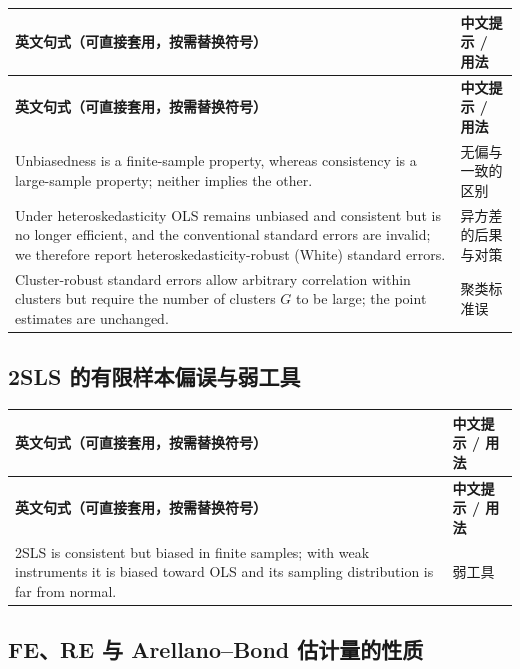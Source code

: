 {\renewcommand{\arraystretch}{1.15}\begin{longtable}{@{}>{\raggedright\arraybackslash}p{11.4cm}>{\raggedright\arraybackslash\small}p{4.3cm}@{}}
\toprule
\textbf{英文句式（可直接套用，按需替换符号）} & \textbf{中文提示 / 用法}\\
\midrule
\endfirsthead
\toprule
\textbf{英文句式（可直接套用，按需替换符号）} & \textbf{中文提示 / 用法}\\
\midrule
\endhead
\bottomrule
\endlastfoot
Unbiasedness is a finite-sample property, whereas consistency is a large-sample property; neither implies the other. & 无偏与一致的区别\\
\addlinespace[2pt]
Under heteroskedasticity OLS remains unbiased and consistent but is no longer efficient, and the conventional standard errors are invalid; we therefore report heteroskedasticity-robust (White) standard errors. & 异方差的后果与对策\\
\addlinespace[2pt]
Cluster-robust standard errors allow arbitrary correlation within clusters but require the number of clusters $G$ to be large; the point estimates are unchanged. & 聚类标准误\\
\end{longtable}}


\subsection{2SLS 的有限样本偏误与弱工具}

{\renewcommand{\arraystretch}{1.15}\begin{longtable}{@{}>{\raggedright\arraybackslash}p{11.4cm}>{\raggedright\arraybackslash\small}p{4.3cm}@{}}
\toprule
\textbf{英文句式（可直接套用，按需替换符号）} & \textbf{中文提示 / 用法}\\
\midrule
\endfirsthead
\toprule
\textbf{英文句式（可直接套用，按需替换符号）} & \textbf{中文提示 / 用法}\\
\midrule
\endhead
\bottomrule
\endlastfoot
2SLS is consistent but biased in finite samples; with weak instruments it is biased toward OLS and its sampling distribution is far from normal. & 弱工具\\
\end{longtable}}


\subsection{FE、RE 与 Arellano–Bond 估计量的性质}

